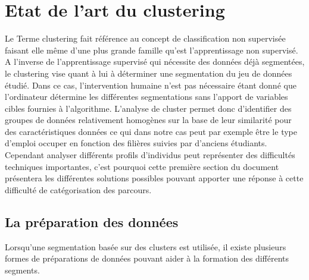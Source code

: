 \documentclass[memoire.tex]{subfiles}
\begin{document}
\chapter{Etat de l'art du clustering}
Le Terme clustering fait référence au concept de classification non supervisée faisant elle même d'une plus grande famille qu'est l'apprentissage non supervisé. A l'inverse de l'apprentissage supervisé qui nécessite des données déjà segmentées, le clustering vise quant à lui à déterminer une segmentation du jeu de données étudié. Dans ce cas, l'intervention humaine n'est pas nécessaire étant donné  que l'ordinateur détermine les différentes segmentations sans l'apport de variables cibles fournies à l'algorithme.
L'analyse de cluster permet donc d'identifier des groupes de données relativement homogènes sur la base de leur similarité pour des caractéristiques données ce qui dans notre cas peut par exemple être le type d'emploi occuper en fonction des filières suivies par d'anciens étudiants. Cependant analyser différents profils d'individus peut représenter des difficultés techniques importantes, c'est pourquoi cette première section du document présentera les différentes solutions possibles pouvant apporter une réponse à cette difficulté de catégorisation des parcours.
\section{La préparation des données}
Lorsqu'une segmentation basée sur des clusters est utilisée, il existe plusieurs formes de préparations de données pouvant aider à la formation des différents segments. 
\end{document}
